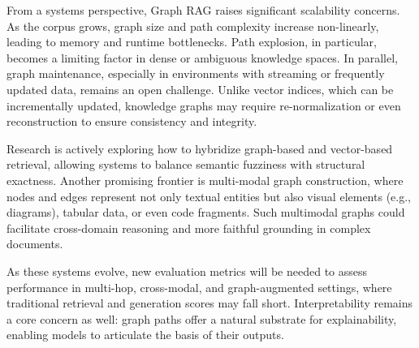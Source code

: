 \documentclass[12pt,twoside]{report}
\begin{document}
From a systems perspective, Graph RAG raises significant scalability concerns. As the corpus grows, graph size and path complexity increase non-linearly, leading to memory and runtime bottlenecks. Path explosion, in particular, becomes a limiting factor in dense or ambiguous knowledge spaces. In parallel, graph maintenance, especially in environments with streaming or frequently updated data, remains an open challenge. Unlike vector indices, which can be incrementally updated, knowledge graphs may require re-normalization or even reconstruction to ensure consistency and integrity.

Research is actively exploring how to hybridize graph-based and vector-based retrieval, allowing systems to balance semantic fuzziness with structural exactness. Another promising frontier is multi-modal graph construction, where nodes and edges represent not only textual entities but also visual elements (e.g., diagrams), tabular data, or even code fragments. Such multimodal graphs could facilitate cross-domain reasoning and more faithful grounding in complex documents.

As these systems evolve, new evaluation metrics will be needed to assess performance in multi-hop, cross-modal, and graph-augmented settings, where traditional retrieval and generation scores may fall short. Interpretability remains a core concern as well: graph paths offer a natural substrate for explainability, enabling models to articulate the basis of their outputs.
\end{document}
